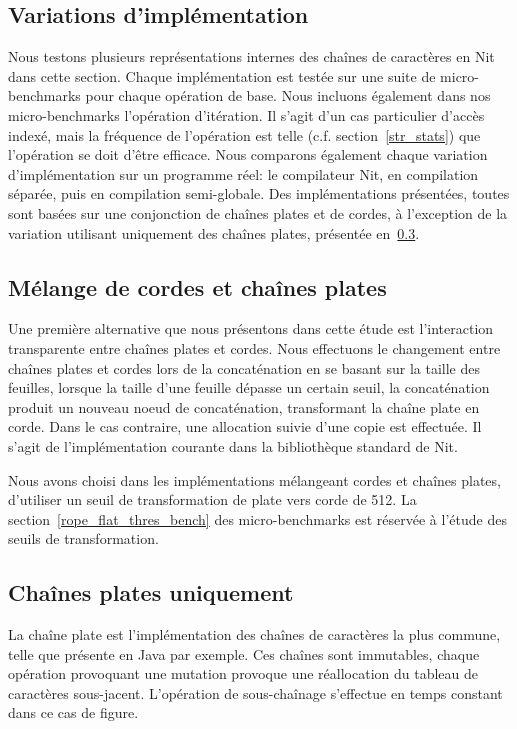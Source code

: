\subsection{Variations d'implémentation}

Nous testons plusieurs représentations internes des chaînes de caractères en Nit dans cette section.
Chaque implémentation est testée sur une suite de micro-benchmarks pour chaque opération de base.
Nous incluons également dans nos micro-benchmarks l'opération d'itération.
Il s'agit d'un cas particulier d'accès indexé, mais la fréquence de l'opération est telle (c.f.
section~\ref{str_stats}) que l'opération se doit d'être efficace.
Nous comparons également chaque variation d'implémentation sur un programme réel: le compilateur Nit,
en compilation séparée, puis en compilation semi-globale.
Des implémentations présentées, toutes sont basées sur une conjonction de chaînes plates et de cordes, à
l'exception de la variation utilisant uniquement des chaînes plates, présentée en~\ref{flat_only_prez}.

\subsection{Mélange de cordes et chaînes plates}\label{mix_flat_rope_prez}

Une première alternative que nous présentons dans cette étude est l'interaction
transparente entre chaînes plates et cordes.
Nous effectuons le changement entre chaînes plates et cordes lors de la concaténation
en se basant sur la taille des feuilles, lorsque la taille d'une feuille dépasse un
certain seuil, la concaténation produit un nouveau noeud
de concaténation, transformant la chaîne plate en corde.
Dans le cas contraire, une allocation suivie d'une copie est effectuée.
Il s'agit de l'implémentation courante dans la bibliothèque standard de Nit.

Nous avons choisi dans les implémentations mélangeant cordes et
chaînes plates, d'utiliser un seuil de transformation de plate vers
corde de 512.
La section~\ref{rope_flat_thres_bench} des micro-benchmarks est
réservée à l'étude des seuils de transformation.

\subsection{Chaînes plates uniquement}\label{flat_only_prez}

La chaîne plate est l'implémentation des chaînes de caractères la plus commune, telle que
présente en Java par exemple.
Ces chaînes sont immutables, chaque opération provoquant
une mutation provoque une réallocation du tableau de caractères sous-jacent.
L'opération de sous-chaînage s'effectue en temps constant dans ce cas de figure.

